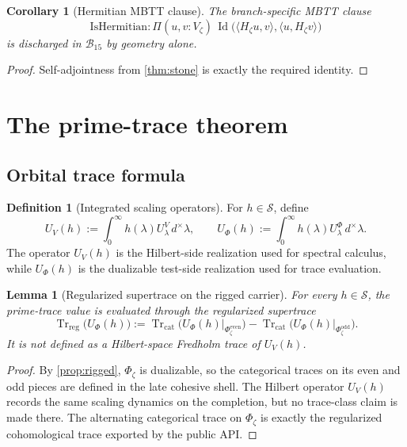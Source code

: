 \documentclass[11pt,a4paper]{article}
\theoremstyle{plain}
\newtheorem{lemma}[theorem]{Lemma}
\newtheorem{corollary}[theorem]{Corollary}
\theoremstyle{definition}
\newtheorem{definition}[theorem]{Definition}
\newcommand{\Bcal}{\mathcal{B}}
\newcommand{\Trreg}{\operatorname{Tr}_{\mathrm{reg}}}
\newcommand{\Trcat}{\operatorname{Tr}_{\mathrm{cat}}}
\newcommand{\Id}{\operatorname{Id}}
\newcommand{\dmu}{d^{\times}}
\begin{document}
\begin{corollary}[Hermitian MBTT clause]
\label{cor:hermitian-clause}
The branch-specific MBTT clause
\[
  \mathrm{IsHermitian}:\Pi(u,v:V_{\zeta})\,\Id\bigl(\langle H_{\zeta}u,v\rangle,\langle u,H_{\zeta}v\rangle\bigr)
\]
is discharged in $\Bcal_{15}$ by geometry alone.
\end{corollary}

\begin{proof}
Self-adjointness from \cref{thm:stone} is exactly the required identity.
\end{proof}

\section{The prime-trace theorem}
\label{sec:trace}

\subsection{Orbital trace formula}

\begin{definition}[Integrated scaling operators]
For $h\in\mathscr S$, define
\[
  U_V(h):=\int_{0}^{\infty} h(\lambda)U^V_{\lambda}\,\dmu\lambda,
  \qquad
  U_{\Phi}(h):=\int_{0}^{\infty} h(\lambda)U^{\Phi}_{\lambda}\,\dmu\lambda.
\]
The operator $U_V(h)$ is the Hilbert-side realization used for spectral calculus, while $U_{\Phi}(h)$ is the dualizable test-side realization used for trace evaluation.
\end{definition}

\begin{lemma}[Regularized supertrace on the rigged carrier]
\label{lem:trreg}
For every $h\in\mathscr S$, the prime-trace value is evaluated through the regularized supertrace
\[
  \Trreg\bigl(U_{\Phi}(h)\bigr)
  :=
  \Trcat\!\bigl(U_{\Phi}(h)\big|_{\Phi_{\zeta}^{\mathrm{even}}}\bigr)
  -
  \Trcat\!\bigl(U_{\Phi}(h)\big|_{\Phi_{\zeta}^{\mathrm{odd}}}\bigr).
\]
It is not defined as a Hilbert-space Fredholm trace of $U_V(h)$.
\end{lemma}

\begin{proof}
By \cref{prop:rigged}, $\Phi_{\zeta}$ is dualizable, so the categorical traces on its even and odd pieces are defined in the late cohesive shell. The Hilbert operator $U_V(h)$ records the same scaling dynamics on the completion, but no trace-class claim is made there. The alternating categorical trace on $\Phi_{\zeta}$ is exactly the regularized cohomological trace exported by the public API.
\end{proof}
\end{document}
